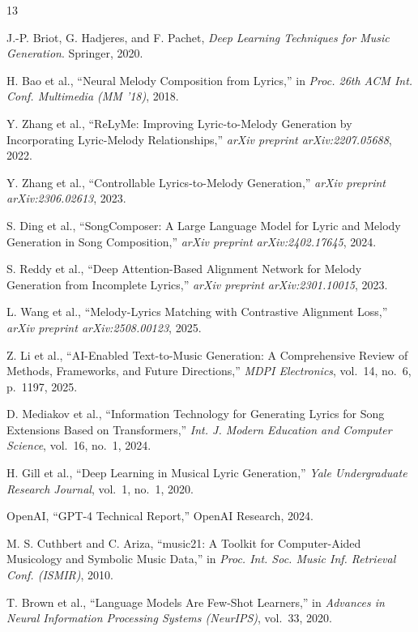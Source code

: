 \documentclass[conference]{IEEEtran}
\begin{document}
\begin{thebibliography}{13}

J.-P. Briot, G. Hadjeres, and F. Pachet,
\textit{Deep Learning Techniques for Music Generation}.
Springer, 2020.

H. Bao et al.,
``Neural Melody Composition from Lyrics,''
in \textit{Proc. 26th ACM Int. Conf. Multimedia (MM '18)}, 2018.

Y. Zhang et al.,
``ReLyMe: Improving Lyric-to-Melody Generation by Incorporating
Lyric-Melody Relationships,''
\textit{arXiv preprint arXiv:2207.05688}, 2022.

Y. Zhang et al.,
``Controllable Lyrics-to-Melody Generation,''
\textit{arXiv preprint arXiv:2306.02613}, 2023.

S. Ding et al.,
``SongComposer: A Large Language Model for Lyric and Melody Generation
in Song Composition,''
\textit{arXiv preprint arXiv:2402.17645}, 2024.

S. Reddy et al.,
``Deep Attention-Based Alignment Network for Melody Generation from
Incomplete Lyrics,''
\textit{arXiv preprint arXiv:2301.10015}, 2023.

L. Wang et al.,
``Melody-Lyrics Matching with Contrastive Alignment Loss,''
\textit{arXiv preprint arXiv:2508.00123}, 2025.

Z. Li et al.,
``AI-Enabled Text-to-Music Generation: A Comprehensive Review of Methods,
Frameworks, and Future Directions,''
\textit{MDPI Electronics}, vol.\ 14, no.\ 6, p.\ 1197, 2025.

D. Mediakov et al.,
``Information Technology for Generating Lyrics for Song Extensions Based
on Transformers,''
\textit{Int. J. Modern Education and Computer Science}, vol.\ 16, no.\ 1, 2024.

H. Gill et al.,
``Deep Learning in Musical Lyric Generation,''
\textit{Yale Undergraduate Research Journal}, vol.\ 1, no.\ 1, 2020.

OpenAI,
``GPT-4 Technical Report,''
OpenAI Research, 2024.

M. S. Cuthbert and C. Ariza,
``music21: A Toolkit for Computer-Aided Musicology and Symbolic Music Data,''
in \textit{Proc. Int. Soc. Music Inf. Retrieval Conf. (ISMIR)}, 2010.

T. Brown et al.,
``Language Models Are Few-Shot Learners,''
in \textit{Advances in Neural Information Processing Systems (NeurIPS)},
vol.\ 33, 2020.

\end{thebibliography}
\end{document}
